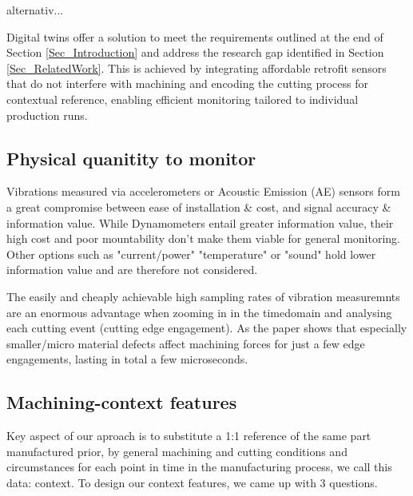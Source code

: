 \documentclass[5p,times,procedia]{elsarticle}
\newenvironment{note}{%
	\noindent
    \color{notecolor}%
}{%
    \par\medskip%
}
\begin{document}
\begin{note}
alternativ...

	Digital twins offer a solution to meet the requirements outlined at the end of Section \ref{Sec_Introduction} and address the research gap identified in Section \ref{Sec_RelatedWork}. This is achieved by integrating affordable retrofit sensors that do not interfere with machining and encoding the cutting process for contextual reference, enabling efficient monitoring tailored to individual production runs.
\end{note}

\subsection{Physical quanitity to monitor}
\vspace*{-\baselineskip}
Vibrations measured via accelerometers or Acoustic Emission (AE) sensors form a great compromise between ease of installation \& cost, and signal accuracy \& information value. While Dynamometers entail greater information value, their high cost and poor mountability don't make them viable for general monitoring. Other options such as "current/power" "temperature" or "sound" hold lower information value and are therefore not considered.

The easily and cheaply achievable high sampling rates of vibration measuremnts are an enormous advantage when zooming in in the timedomain and analysing each cutting event (cutting edge engagement). As the paper \cite{Pfirrmann.Baumann.ea2021} shows that especially smaller/micro material defects affect machining forces for just a few edge engagements, lasting in total a few microseconds.

\subsection{Machining-context features}
\vspace*{-\baselineskip}

Key aspect of our aproach is to substitute a 1:1 reference of the same part manufactured prior, by general machining and cutting conditions and circumstances for each point in time in the manufacturing process, we call this data: context.
To design our context features, we came up with 3 questions.
\end{document}
